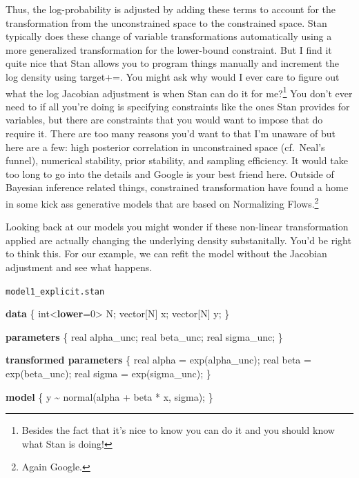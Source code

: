 \documentclass[
  letterpaper,
  DIV=11,
  numbers=noendperiod]{scrartcl}
\newenvironment{Shaded}{\begin{snugshade}}{\end{snugshade}}
\newcommand{\DataTypeTok}[1]{\textcolor[rgb]{0.68,0.00,0.00}{#1}}
\newcommand{\DecValTok}[1]{\textcolor[rgb]{0.68,0.00,0.00}{#1}}
\newcommand{\KeywordTok}[1]{\textcolor[rgb]{0.00,0.23,0.31}{\textbf{#1}}}
\newcommand{\NormalTok}[1]{\textcolor[rgb]{0.00,0.23,0.31}{#1}}
\begin{document}
Thus, the log-probability is adjusted by adding these terms to account
for the transformation from the unconstrained space to the constrained
space. Stan typically does these change of variable transformations
automatically using a more generalized transformation for the
lower-bound constraint. But I find it quite nice that Stan allows you to
program things manually and increment the log density using target+=.
You might ask why would I ever care to figure out what the log Jacobian
adjustment is when Stan can do it for me?\footnote{Besides the fact that
  it's nice to know you can do it and you should know what Stan is
  doing!} You don't ever need to if all you're doing is specifying
constraints like the ones Stan provides for variables, but there are
constraints that you would want to impose that do require it. There are
too many reasons you'd want to that I'm unaware of but here are a few:
high posterior correlation in unconstrained space (cf.~Neal's funnel),
numerical stability, prior stability, and sampling efficiency. It would
take too long to go into the details and Google is your best friend
here. Outside of Bayesian inference related things, constrained
transformation have found a home in some kick ass generative models that
are based on Normalizing Flows.\footnote{Again Google.}

Looking back at our models you might wonder if these non-linear
transformation applied are actually changing the underlying density
substanitally. You'd be right to think this. For our example, we can
refit the model without the Jacobian adjustment and see what happens.

\begin{codelisting}

\caption{\texttt{model1\_explicit.stan}}

\begin{Shaded}
\begin{Highlighting}[]
\KeywordTok{data}\NormalTok{ \{}
    \DataTypeTok{int}\NormalTok{\textless{}}\KeywordTok{lower}\NormalTok{=}\DecValTok{0}\NormalTok{\textgreater{} N;}
    \DataTypeTok{vector}\NormalTok{[N] x;}
    \DataTypeTok{vector}\NormalTok{[N] y;}
\NormalTok{\}}

\KeywordTok{parameters}\NormalTok{ \{}
    \DataTypeTok{real}\NormalTok{ alpha\_unc; }
    \DataTypeTok{real}\NormalTok{ beta\_unc;}
    \DataTypeTok{real}\NormalTok{ sigma\_unc;}
\NormalTok{\}}

\KeywordTok{transformed parameters}\NormalTok{ \{}
    \DataTypeTok{real}\NormalTok{ alpha = exp(alpha\_unc); }
    \DataTypeTok{real}\NormalTok{ beta = exp(beta\_unc);   }
    \DataTypeTok{real}\NormalTok{ sigma = exp(sigma\_unc); }
\NormalTok{\}}

\KeywordTok{model}\NormalTok{ \{}
\NormalTok{    y \textasciitilde{} normal(alpha + beta * x, sigma);}
\NormalTok{\}}
\end{Highlighting}
\end{Shaded}

\end{codelisting}
\end{document}
